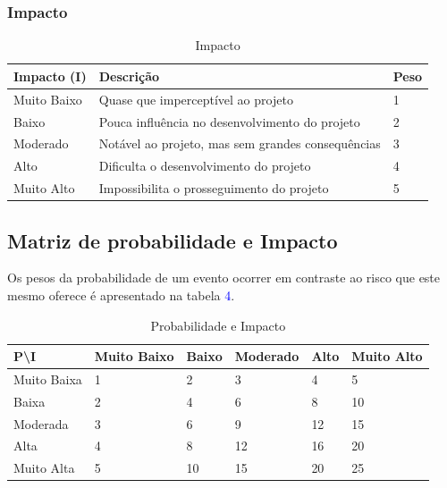 \subsubsection{Impacto}

\begin{table}[h]
\centering
\caption{Impacto}
\label{impacto}
\begin{tabular}{|l|l|l|}
\hline
\textbf{Impacto (I)} & \textbf{Descrição}                                & \textbf{Peso} \\  \hline
Muito Baixo          & Quase que imperceptível ao projeto                & 1             \\
Baixo                & Pouca influência no desenvolvimento do projeto    & 2             \\
Moderado             & Notável ao projeto, mas sem grandes consequências & 3             \\
Alto                 & Dificulta o desenvolvimento do projeto            & 4             \\ 
Muito Alto           & Impossibilita o prosseguimento do projeto         & 5             \\ 
\hline
\end{tabular}
\end{table}

\subsection{Matriz de probabilidade e Impacto}

	Os pesos da probabilidade de um evento ocorrer em contraste ao risco que este mesmo oferece é apresentado na tabela \textcolor{blue}{4}.  

\begin{table}[h]
\centering
\caption{Probabilidade e Impacto}
\label{probabilidade-impacto}
\begin{tabular}{|l|l|l|l|l|l|}
\hline
P\textbackslash I  & Muito Baixo & Baixo & Moderado & Alto & Muito Alto \\ \hline
Muito Baixa                  & 1                               & 2                         & 3                   & 4               & 5                     \\ 
Baixa                    & 2                               & 4                         & 6                   & 8               & 10                    \\
Moderada                     & 3                               & 6                         & 9                   & 12              & 15                    \\ 
Alta                         & 4                               & 8                         & 12                  & 16              & 20                    \\ 
Muito Alta                   & 5                               & 10                        & 15                  & 20              & 25                    \\ 
\hline
\end{tabular}
\end{table}

